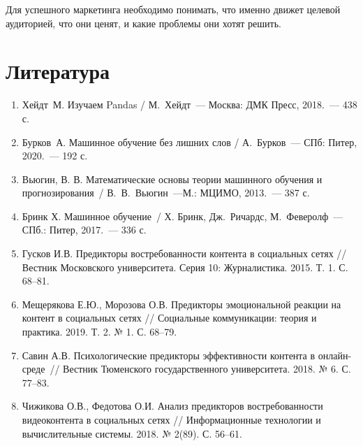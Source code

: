 \documentclass[a4paper,12pt]{article}
\begin{document}
Для успешного маркетинга необходимо понимать, что именно движет целевой аудиторией, что они ценят, и какие проблемы они хотят решить.

	
\section{Литература}

\begin{enumerate}
	\item Хейдт М. Изучаем Pandas / М. Хейдт~--- Москва: ДМК Пресс, 2018.~--- 438 с.
	\item Бурков А. Машинное обучение без лишних слов / А. Бурков~--- СПб: Питер, 2020.~--- 192 с.
	\item Вьюгин, В. В. Математические основы теории машинного обучения и прогнозирования / В. В. Вьюгин~---М.: МЦИМО, 2013.~--- 387 с.
	\item Бринк Х. Машинное обучение / Х. Бринк, Дж. Ричардс, М. Феверолф~--- СПб.: Питер, 2017.~--- 336 с.
	\item Гусков И.В. Предикторы востребованности контента в социальных сетях // Вестник Московского университета. Серия 10: Журналистика. 2015. Т. 1. С. 68--81.
	\item Мещерякова Е.Ю., Морозова О.В. Предикторы эмоциональной реакции на контент в социальных сетях // Социальные коммуникации: теория и практика. 2019. Т. 2. № 1. С. 68--79.
	\item Савин А.В. Психологические предикторы эффективности контента в онлайн-среде // Вестник Тюменского государственного университета. 2018. № 6. С. 77--83.
	\item Чижикова О.В., Федотова О.И. Анализ предикторов востребованности видеоконтента в социальных сетях // Информационные технологии и вычислительные системы. 2018. № 2(89). С. 56--61.
\end{enumerate}

 


	
	
	

%	
%	
%	
%	
%	
%	
\end{document}
